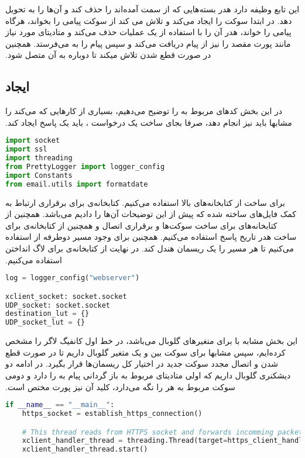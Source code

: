 ‫این تابع وظیفه دارد هدر بسته‌هایی که از سمت  آمده‌اند را حذف کند و آن‌ها را به  تحویل دهد. در ابتدا سوکت  را ایجاد می‌کند و تلاش می کند از سوکت  پیامی را بخواند، هرگاه پیامی را خواند، هدر آن را با استفاده از یک عملیات حذف می‌کند و متادیتای مورد نیاز مانند پورت مقصد را نیز از پیام دریافت می‌کند و سپس پیام را به  می‌فرستد. همچنین در صورت قطع شدن  تلاش میکند تا دوباره به آن متصل شود.
‫
‫\subsection{ایجاد }
‫در این بخش کدهای مربوط به  را توضیح می‌دهیم، بسیاری از کارهایی که  می‌کند را مشابها باید  نیز انجام دهد، صرفا بجای ساخت یک درخواست ، باید یک پاسخ  ایجاد کند.
‫
‫
\begin{latin}
\begin{lstlisting}[firstnumber=1, language=Python]
import socket
import ssl
import threading
from PrettyLogger import logger_config
import Constants
from email.utils import formatdate
\end{lstlisting}
\end{latin}
‫
‫برای ساخت  از کتابخانه‌های بالا استفاده می‌کنیم. کتابخانه‌ی  برای برقراری ارتباط  به کمک فایل‌های ساخته شده که پیش از این توضیحات آن‌ها را دادیم می‌باشد. همچنین از کتابخانه‌های  برای ساخت سوکت‌ها و برقراری اتصال و همچنین از کتابخانه‌ی  برای ساخت هدر تاریخ پاسخ  استفاده می‌کنیم. همچنین برای وجود مسیر دوطرفه از  استفاده می‌کنیم تا هر مسیر را یک ریسمان هندل کند. در نهایت از کتابخانه‌ی  برای لاگ انداختن استفاده می‌کنیم.
‫
\begin{latin}
\begin{lstlisting}[firstnumber=10, language=Python]
log = logger_config("webserver")

xclient_socket: socket.socket
UDP_socket: socket.socket
destination_lut = {}
UDP_socket_lut = {}
\end{lstlisting}
\end{latin}

‫این بخش مشابه با  برای متغیرهای گلوبال می‌باشد، در خط اول کانفیگ لاگر را مشخص کرده‌ایم، سپس مشابها برای سوکت بین  و  یک متغیر گلوبال داریم تا در صورت قطع شدن  و اتصال مجدد سوکت جدید در اختیار کل ریسمان‌ها قرار بگیرد. در ادامه دو دیشکنری گلوبال داریم که اولی متادیتای مربوط به باز گردانی پیام به  را دارد و دومی سوکت مربوط به هر  را نگه می‌دارد، کلید آن نیز پورت مختص  است.
‫
\begin{latin}
\begin{lstlisting}[firstnumber=90, language=Python]
if __name__ == "__main__":
	https_socket = establish_https_connection()

	# This thread reads from HTTPS socket and forwards incomming packets to SERVER_PORT after removing custom header
	xclient_handler_thread = threading.Thread(target=https_client_handler, args=(https_socket, ))
	xclient_handler_thread.start()
\end{lstlisting}
\end{latin}

